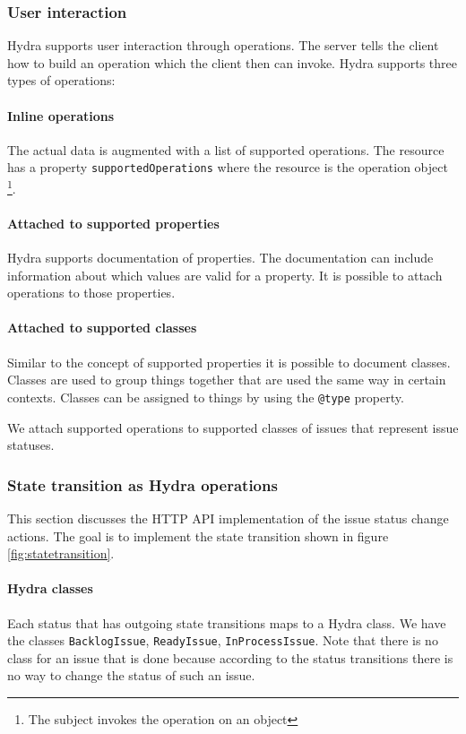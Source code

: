 \subsubsection{User interaction}
Hydra supports user interaction through operations. The server tells the client how to build an operation which the client then can invoke. Hydra supports three types of operations:

\paragraph{Inline operations}
The actual data is augmented with a list of supported operations. The resource has a property \lstinline{supportedOperations} where the resource is the operation object \footnote{The subject invokes the operation on an object}.

\paragraph{Attached to supported properties}
Hydra supports documentation of properties. The documentation can include information about which values are valid for a property. It is possible to attach operations to those properties.

\paragraph{Attached to supported classes}
Similar to the concept of supported properties it is possible to document classes. Classes are used to group things together that are used the same way in certain contexts. Classes can be assigned to things by using the \lstinline{@type} property.

We attach supported operations to supported classes of issues that represent issue statuses.

\subsubsection{State transition as Hydra operations}
This section discusses the HTTP API implementation of the issue status change actions. The goal is to implement the state transition shown in figure \ref{fig:statetransition}.

\paragraph{Hydra classes}\label{par:classes}
Each status that has outgoing state transitions maps to a Hydra class. We have the classes \lstinline{BacklogIssue}, \lstinline{ReadyIssue}, \lstinline{InProcessIssue}. Note that there is no class for an issue that is done because according to the status transitions there is no way to change the status of such an issue.

